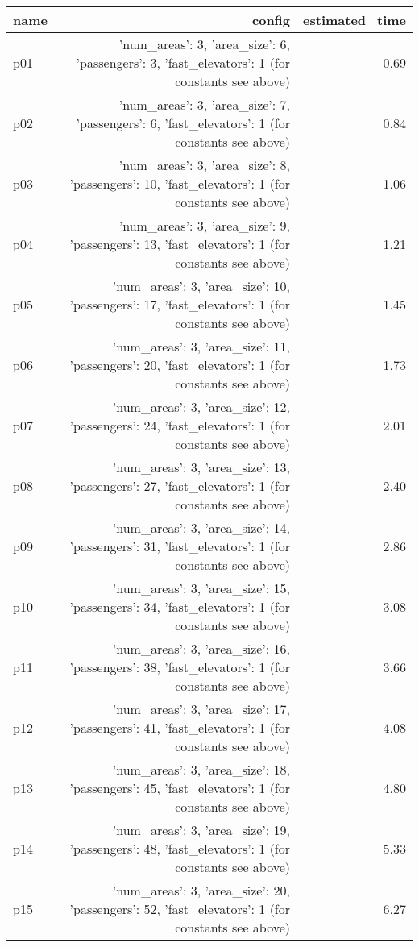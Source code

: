 \documentclass{article}
\begin{document}
                            \begin{center}
                            \scriptsize
                            \begin{tabular}{@{}l|r|r@{}}
                            name & config & estimated\_time\\\midrule
                              p01&{'num\_areas': 3, 'area\_size': 6, 'passengers': 3, 'fast\_elevators': 1 (for constants see above)}&0.69\\
  p02&{'num\_areas': 3, 'area\_size': 7, 'passengers': 6, 'fast\_elevators': 1 (for constants see above)}&0.84\\
  p03&{'num\_areas': 3, 'area\_size': 8, 'passengers': 10, 'fast\_elevators': 1 (for constants see above)}&1.06\\
  p04&{'num\_areas': 3, 'area\_size': 9, 'passengers': 13, 'fast\_elevators': 1 (for constants see above)}&1.21\\
  p05&{'num\_areas': 3, 'area\_size': 10, 'passengers': 17, 'fast\_elevators': 1 (for constants see above)}&1.45\\
  p06&{'num\_areas': 3, 'area\_size': 11, 'passengers': 20, 'fast\_elevators': 1 (for constants see above)}&1.73\\
  p07&{'num\_areas': 3, 'area\_size': 12, 'passengers': 24, 'fast\_elevators': 1 (for constants see above)}&2.01\\
  p08&{'num\_areas': 3, 'area\_size': 13, 'passengers': 27, 'fast\_elevators': 1 (for constants see above)}&2.40\\
  p09&{'num\_areas': 3, 'area\_size': 14, 'passengers': 31, 'fast\_elevators': 1 (for constants see above)}&2.86\\
  p10&{'num\_areas': 3, 'area\_size': 15, 'passengers': 34, 'fast\_elevators': 1 (for constants see above)}&3.08\\
  p11&{'num\_areas': 3, 'area\_size': 16, 'passengers': 38, 'fast\_elevators': 1 (for constants see above)}&3.66\\
  p12&{'num\_areas': 3, 'area\_size': 17, 'passengers': 41, 'fast\_elevators': 1 (for constants see above)}&4.08\\
  p13&{'num\_areas': 3, 'area\_size': 18, 'passengers': 45, 'fast\_elevators': 1 (for constants see above)}&4.80\\
  p14&{'num\_areas': 3, 'area\_size': 19, 'passengers': 48, 'fast\_elevators': 1 (for constants see above)}&5.33\\
  p15&{'num\_areas': 3, 'area\_size': 20, 'passengers': 52, 'fast\_elevators': 1 (for constants see above)}&6.27\\

\end{tabular}
\end{center}
\end{document}
